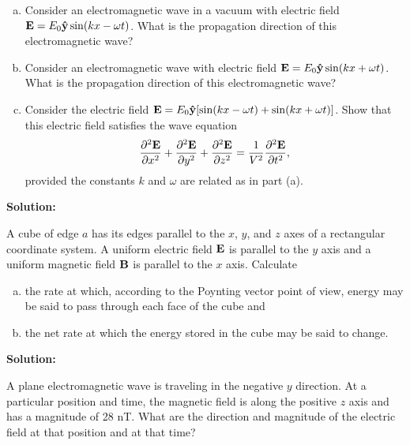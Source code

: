 \documentclass[11pt]{article}
\newcommand{\be}{\begin{enumerate}[a) ]}
\newcommand{\ee}{\end{enumerate}}
\newcommand{\pdrr}[2]{\frac{\partial^2 #1}{\partial #2^2}}
\begin{document}
\begin{problem}
\be
\item Consider an electromagnetic wave in a vacuum with electric field $\mathbf{E} = E_0\mathbf{\hat{y}} \sin(kx-\omega t)$. What
is the propagation direction of this electromagnetic wave?
\item Consider an electromagnetic wave with electric field $\mathbf{E} = E_0\mathbf{\hat{y}} \sin(kx + \omega t)$. What is the
propagation direction of this electromagnetic wave?
\item Consider the electric field $\mathbf{E} = E_0\mathbf{\hat{y}} [\sin(kx - \omega t) + \sin(kx + \omega t)]$. Show that this electric field
satisfies the wave equation
\[
	\pdrr{\VEC{E}}{x} + \pdrr{\VEC{E}}{y} + \pdrr{\VEC{E}}{z} = \frac{1}{V^2}\pdrr{\VEC{E}}{t},
\]
provided the constants $k$ and $\omega$ are related as in part (a).
\ee
\end{problem}


\textbf{Solution:}\\

\clearpage

\begin{problem}
A cube of edge $a$ has its edges parallel to the $x$, $y$, and $z$ axes of a rectangular coordinate system.
A uniform electric field $\mathbf{E}$ is parallel to the $y$ axis and a uniform magnetic field $\mathbf{B}$ is parallel to the
$x$ axis. Calculate
\be
\item the rate at which, according to the Poynting vector point of view, energy may be said to pass
through each face of the cube and
\item the net rate at which the energy stored in the cube may be said to change.
\ee
\end{problem}


\textbf{Solution:}\\

\clearpage

\begin{problem}
A plane electromagnetic wave is traveling in the negative $y$ direction. At a particular position and
time, the magnetic field is along the positive $z$ axis and has a magnitude of 28 nT. What are the
direction and magnitude of the electric field at that position and at that time?
\end{problem}
\end{document}
